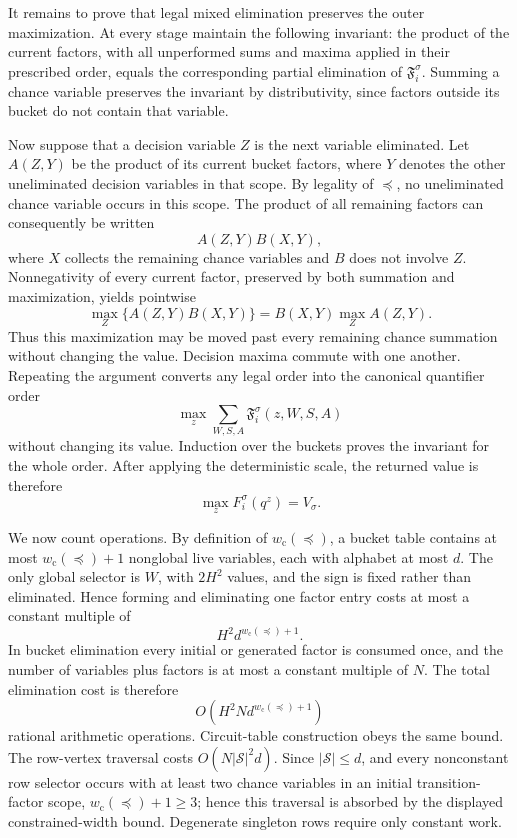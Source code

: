 It remains to prove that legal mixed elimination preserves the outer maximization.  At every stage maintain the following invariant: the product of the current factors, with all unperformed sums and maxima applied in their prescribed order, equals the corresponding partial elimination of \(\mathfrak F_i^\sigma\).  Summing a chance variable preserves the invariant by distributivity, since factors outside its bucket do not contain that variable.

Now suppose that a decision variable \(Z\) is the next variable eliminated.  Let \(A(Z,Y)\) be the product of its current bucket factors, where \(Y\) denotes the other uneliminated decision variables in that scope.  By legality of \(\preceq\), no uneliminated chance variable occurs in this scope.  The product of all remaining factors can consequently be written
\[
 A(Z,Y)B(X,Y),
\]
where \(X\) collects the remaining chance variables and \(B\) does not involve \(Z\).  Nonnegativity of every current factor, preserved by both summation and maximization, yields pointwise
\[
 \max_Z\{A(Z,Y)B(X,Y)\}
 =B(X,Y)\max_Z A(Z,Y).
\]
Thus this maximization may be moved past every remaining chance summation without changing the value.  Decision maxima commute with one another.  Repeating the argument converts any legal order into the canonical quantifier order
\[
 \max_z\sum_{W,S,A}\mathfrak F_i^\sigma(z,W,S,A)
\]
without changing its value.  Induction over the buckets proves the invariant for the whole order.  After applying the deterministic scale, the returned value is therefore
\[
 \max_z F_i^\sigma(q^z)=V_\sigma.
\]

We now count operations.  By definition of \(w_{\mathrm c}(\preceq)\), a bucket table contains at most \(w_{\mathrm c}(\preceq)+1\) nonglobal live variables, each with alphabet at most \(d\).  The only global selector is \(W\), with \(2H^2\) values, and the sign is fixed rather than eliminated.  Hence forming and eliminating one factor entry costs at most a constant multiple of
\[
 H^2d^{w_{\mathrm c}(\preceq)+1}.
\]
In bucket elimination every initial or generated factor is consumed once, and the number of variables plus factors is at most a constant multiple of \(N\).  The total elimination cost is therefore
\[
 O\!\left(H^2N d^{w_{\mathrm c}(\preceq)+1}\right)
\]
rational arithmetic operations.  Circuit-table construction obeys the same bound.  The row-vertex traversal costs \(O(N|\mathcal S|^2d)\).  Since \(|\mathcal S|\le d\), and every nonconstant row selector occurs with at least two chance variables in an initial transition-factor scope, \(w_{\mathrm c}(\preceq)+1\ge3\); hence this traversal is absorbed by the displayed constrained-width bound.  Degenerate singleton rows require only constant work.

